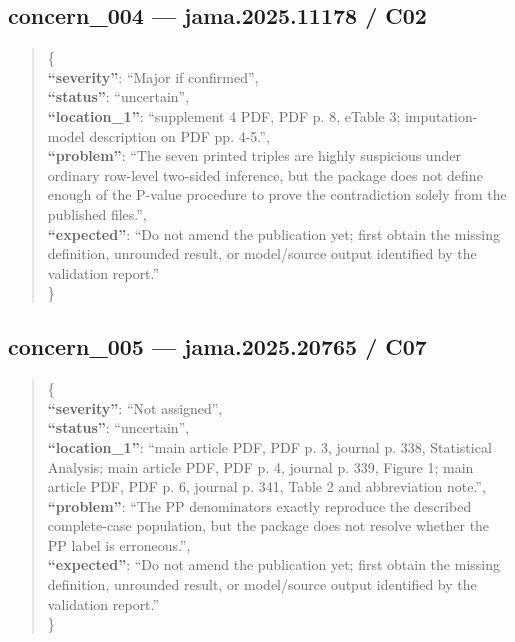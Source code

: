 \documentclass[
  letterpaper,
  9pt]{extreport}
\begin{document}
\hypertarget{concern_004--jama202511178--c02}{%
\subsection{concern\_004 --- jama.2025.11178 /
C02}\label{concern_004--jama202511178--c02}}

\begin{quote}
\{\\
\textbf{``severity''}: ``Major if confirmed'',\\
\textbf{``status''}: ``uncertain'',\\
\textbf{``location\_1''}: ``supplement 4 PDF, PDF p. 8, eTable 3;
imputation-model description on PDF pp. 4-5.'',\\
\textbf{``problem''}: ``The seven printed triples are highly suspicious
under ordinary row-level two-sided inference, but the package does not
define enough of the P-value procedure to prove the contradiction solely
from the published files.'',\\
\textbf{``expected''}: ``Do not amend the publication yet; first obtain
the missing definition, unrounded result, or model/source output
identified by the validation report.''\\
\}
\end{quote}

\hypertarget{concern_005--jama202520765--c07}{%
\subsection{concern\_005 --- jama.2025.20765 /
C07}\label{concern_005--jama202520765--c07}}

\begin{quote}
\{\\
\textbf{``severity''}: ``Not assigned'',\\
\textbf{``status''}: ``uncertain'',\\
\textbf{``location\_1''}: ``main article PDF, PDF p. 3, journal p. 338,
Statistical Analysis; main article PDF, PDF p. 4, journal p. 339, Figure
1; main article PDF, PDF p. 6, journal p. 341, Table 2 and abbreviation
note.'',\\
\textbf{``problem''}: ``The PP denominators exactly reproduce the
described complete-case population, but the package does not resolve
whether the PP label is erroneous.'',\\
\textbf{``expected''}: ``Do not amend the publication yet; first obtain
the missing definition, unrounded result, or model/source output
identified by the validation report.''\\
\}
\end{quote}
\end{document}
